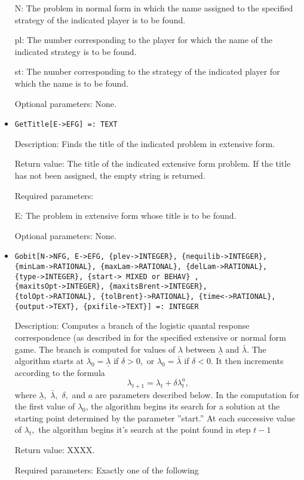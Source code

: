 \begin{itemize}
\bd
\item
[N:] The problem in normal form in which the name assigned to the
specified strategy of the indicated player is to be found.
\item
[pl:] The number corresponding to the player for which the name of the
indicated strategy is to be found.
\item
[st:] The number corresponding to the strategy of the indicated player
for which the name is to be found.
\ed

\item
[Optional parameters:] None.
\ed

\item
\protect \large \begin{verbatim}
GetTitle[E->EFG] =: TEXT
\end{verbatim}\normalsize

\bd
\item
[Description:] Finds the title of the indicated problem in extensive
form.
\item
[Return value:] The title of the indicated extensive form problem.  If
the title has not been assigned, the empty string is returned.
\item
[Required parameters:]\hfil\null

\bd
\item
[E:] The problem in extensive form whose title is to be found.
\ed

\item
[Optional parameters:] None.
\ed

\item
\protect \large \begin{verbatim}
Gobit[N->NFG, E->EFG, {plev->INTEGER}, {nequilib->INTEGER},
{minLam->RATIONAL}, {maxLam->RATIONAL}, {delLam->RATIONAL},
{type->INTEGER}, {start-> MIXED or BEHAV} ,
{maxitsOpt->INTEGER}, {maxitsBrent->INTEGER},
{tolOpt->RATIONAL}, {tolBrent}->RATIONAL}, {time<->RATIONAL},
{output->TEXT}, {pxifile->TEXT}] =: INTEGER
\end{verbatim}\normalsize

\bd
\item
[Description:] Computes a branch of the logistic quantal response
correspondence (as described in \cite[1995]{MckPal:1994} for 
the specified extensive or normal form game.  The branch is computed
for values of $\lambda$ between $\underline{\lambda}$ and
$\bar{\lambda}.$ The algorithm starts at $\lambda_0 =
\underline{\lambda}$ if $\delta>0,$ or $\lambda_0 = \bar{\lambda}$ 
if $\delta<0$. It then increments according to the formula 
$$
\lambda_{t+1} = \lambda_t +\delta \lambda_t^a,
$$ 
where $\underline\lambda,$ $\bar\lambda,$ $\delta,$ and $a$ are
parameters described below. In the computation for the first value of
$\lambda_0$, the algorithm begins its search for a solution at the
starting point determined by the parameter ''start.''  At each
successive value of $\lambda_t,$ the algorithm begins it's search at
the point found in step $t - 1$
\item
[Return value:] XXXX.
\item 
[Required parameters:]\hfil\null Exactly one of the following


\end{itemize}
